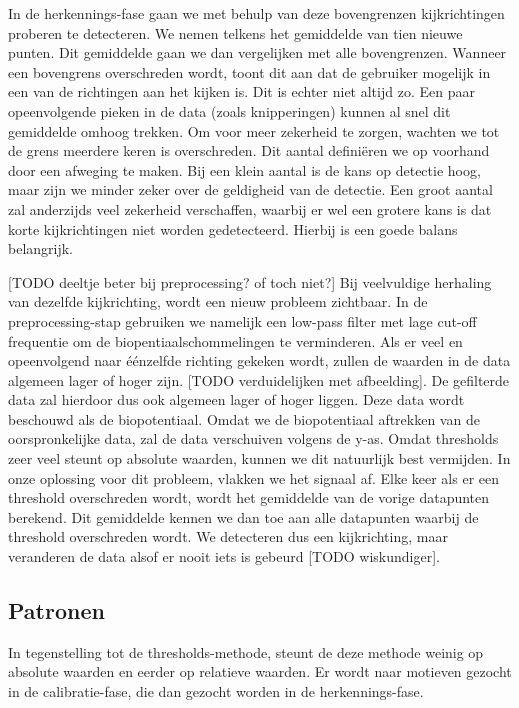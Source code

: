 \documentclass{article}
\begin{document}
In de herkennings-fase gaan we met behulp van deze bovengrenzen kijkrichtingen proberen te detecteren. We nemen telkens het gemiddelde van tien nieuwe punten. Dit gemiddelde gaan we dan vergelijken met alle bovengrenzen. Wanneer een bovengrens overschreden wordt, toont dit aan dat de gebruiker mogelijk in een van de richtingen aan het kijken is. Dit is echter niet altijd zo. Een paar opeenvolgende pieken in de data (zoals knipperingen) kunnen al snel dit gemiddelde omhoog trekken. Om voor meer zekerheid te zorgen, wachten we tot de grens meerdere keren is overschreden. Dit aantal definiëren we op voorhand door een afweging te maken. Bij een klein aantal is de kans op detectie hoog, maar zijn we minder zeker over de geldigheid van de detectie. Een groot aantal zal anderzijds veel zekerheid verschaffen, waarbij er wel een grotere kans is dat korte kijkrichtingen niet worden gedetecteerd. Hierbij is een goede balans belangrijk.

[TODO deeltje beter bij preprocessing? of toch niet?]
Bij veelvuldige herhaling van dezelfde kijkrichting, wordt een nieuw probleem zichtbaar. In de preprocessing-stap gebruiken we namelijk een low-pass filter met lage cut-off frequentie om de biopentiaalschommelingen te verminderen. Als er veel en opeenvolgend naar éénzelfde richting gekeken wordt, zullen de waarden in de data algemeen lager of hoger zijn. [TODO verduidelijken met afbeelding]. De gefilterde data zal hierdoor dus ook algemeen lager of hoger liggen. Deze data wordt beschouwd als de biopotentiaal. Omdat we de biopotentiaal aftrekken van de oorspronkelijke data, zal de data verschuiven volgens de y-as. Omdat thresholds zeer veel steunt op absolute waarden, kunnen we dit natuurlijk best vermijden. In onze oplossing voor dit probleem, vlakken we het signaal af. Elke keer als er een threshold overschreden wordt, wordt het gemiddelde van de vorige datapunten berekend. Dit gemiddelde kennen we dan toe aan alle datapunten waarbij de threshold overschreden wordt. We detecteren dus een kijkrichting, maar veranderen de data alsof er nooit iets is gebeurd [TODO wiskundiger].

\subsection{Patronen}

In tegenstelling tot de thresholds-methode, steunt de deze methode weinig op absolute waarden en eerder op relatieve waarden. Er wordt naar motieven gezocht in de calibratie-fase, die dan gezocht worden in de herkennings-fase. \cite{motifs}
\end{document}
